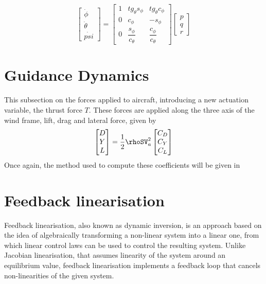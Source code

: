\begin{equation}
\begin{bmatrix}
\dot{\phi}\\
\dot{\theta}\\
\dot{psi}
\end{bmatrix}
=
\begin{bmatrix}
1 & tg_\theta s_\phi & tg_\theta c_\phi\\
0 & c_\phi & -s_\phi\\
0 & \dfrac{s_\phi}{c_\theta} & \dfrac{c_\phi}{c_\theta}
\end{bmatrix}
\begin{bmatrix}
p\\
q\\
r
\end{bmatrix}
\label{eq:euler2omega}
\end{equation}

\section{Guidance Dynamics}
\label{background/model/guidance_dynamics}

This subsection on the forces applied to aircraft, introducing a new actuation variable, the thrust force $T$. These forces are applied along the three axis of the wind frame, lift, drag and lateral force, given by
\begin{equation}
\begin{bmatrix}
D\\
Y\\
L
\end{bmatrix}
= \dfrac{1}{2}\rhoSV_a^2
\begin{bmatrix}
C_D\\
C_Y\\
C_L
\end{bmatrix}
\label{eq:forces}
\end{equation}
Once again, the method used to compute these coefficients will be given in 


\section{Feedback linearisation}
\label{section:background/NLI}

Feedback linearisation, also known as dynamic inversion, is an approach based on the idea of algebraically transforming a non-linear system into a linear one, from which linear control laws can be used to control the resulting system. Unlike Jacobian linearisation, that assumes linearity of the system around an equilibrium value, feedback linearisation implements a feedback loop that cancels non-linearities of the given system. 



